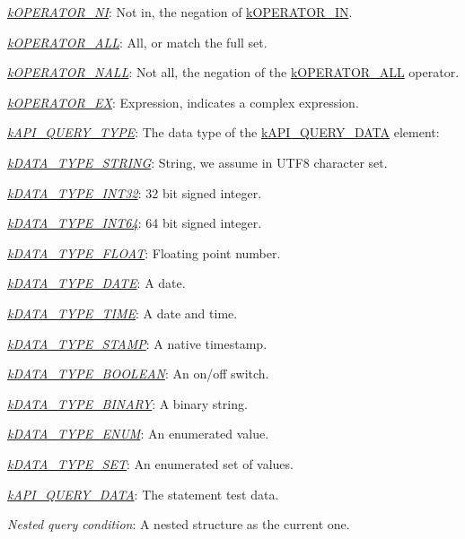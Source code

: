 \begin{DoxyItemize}
\begin{DoxyItemize}
\begin{DoxyItemize}
\begin{DoxyItemize}
\item {\itshape \hyperlink{}{k\-O\-P\-E\-R\-A\-T\-O\-R\-\_\-\-N\-I}\/}\-: Not in, the negation of \hyperlink{}{k\-O\-P\-E\-R\-A\-T\-O\-R\-\_\-\-I\-N}. 
\item {\itshape \hyperlink{}{k\-O\-P\-E\-R\-A\-T\-O\-R\-\_\-\-A\-L\-L}\/}\-: All, or match the full set. 
\item {\itshape \hyperlink{}{k\-O\-P\-E\-R\-A\-T\-O\-R\-\_\-\-N\-A\-L\-L}\/}\-: Not all, the negation of the \hyperlink{}{k\-O\-P\-E\-R\-A\-T\-O\-R\-\_\-\-A\-L\-L} operator. 
\item {\itshape \hyperlink{}{k\-O\-P\-E\-R\-A\-T\-O\-R\-\_\-\-E\-X}\/}\-: Expression, indicates a complex expression. 
\end{DoxyItemize}
\item {\itshape \hyperlink{}{k\-A\-P\-I\-\_\-\-Q\-U\-E\-R\-Y\-\_\-\-T\-Y\-P\-E}\/}\-: The data type of the \hyperlink{}{k\-A\-P\-I\-\_\-\-Q\-U\-E\-R\-Y\-\_\-\-D\-A\-T\-A} element\-: 
\begin{DoxyItemize}
\item {\itshape \hyperlink{}{k\-D\-A\-T\-A\-\_\-\-T\-Y\-P\-E\-\_\-\-S\-T\-R\-I\-N\-G}\/}\-: String, we assume in U\-T\-F8 character set. 
\item {\itshape \hyperlink{}{k\-D\-A\-T\-A\-\_\-\-T\-Y\-P\-E\-\_\-\-I\-N\-T32}\/}\-: 32 bit signed integer. 
\item {\itshape \hyperlink{}{k\-D\-A\-T\-A\-\_\-\-T\-Y\-P\-E\-\_\-\-I\-N\-T64}\/}\-: 64 bit signed integer. 
\item {\itshape \hyperlink{}{k\-D\-A\-T\-A\-\_\-\-T\-Y\-P\-E\-\_\-\-F\-L\-O\-A\-T}\/}\-: Floating point number. 
\item {\itshape \hyperlink{}{k\-D\-A\-T\-A\-\_\-\-T\-Y\-P\-E\-\_\-\-D\-A\-T\-E}\/}\-: A date. 
\item {\itshape \hyperlink{}{k\-D\-A\-T\-A\-\_\-\-T\-Y\-P\-E\-\_\-\-T\-I\-M\-E}\/}\-: A date and time. 
\item {\itshape \hyperlink{}{k\-D\-A\-T\-A\-\_\-\-T\-Y\-P\-E\-\_\-\-S\-T\-A\-M\-P}\/}\-: A native timestamp. 
\item {\itshape \hyperlink{}{k\-D\-A\-T\-A\-\_\-\-T\-Y\-P\-E\-\_\-\-B\-O\-O\-L\-E\-A\-N}\/}\-: An on/off switch. 
\item {\itshape \hyperlink{}{k\-D\-A\-T\-A\-\_\-\-T\-Y\-P\-E\-\_\-\-B\-I\-N\-A\-R\-Y}\/}\-: A binary string. 
\item {\itshape \hyperlink{}{k\-D\-A\-T\-A\-\_\-\-T\-Y\-P\-E\-\_\-\-E\-N\-U\-M}\/}\-: An enumerated value. 
\item {\itshape \hyperlink{}{k\-D\-A\-T\-A\-\_\-\-T\-Y\-P\-E\-\_\-\-S\-E\-T}\/}\-: An enumerated set of values. 
\end{DoxyItemize}
\item {\itshape \hyperlink{}{k\-A\-P\-I\-\_\-\-Q\-U\-E\-R\-Y\-\_\-\-D\-A\-T\-A}\/}\-: The statement test data. 
\end{DoxyItemize}
\item {\itshape Nested query condition\/}\-: A nested structure as the current one. 
\end{DoxyItemize}
\end{DoxyItemize}

